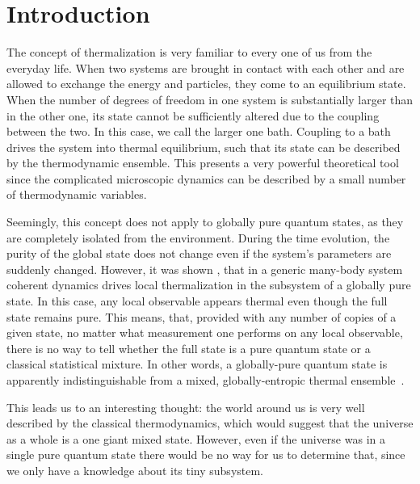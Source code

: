 \chapter{Introduction}
\label{introduction}

The concept of thermalization is very familiar to every one of us from the everyday life. When two systems are brought in contact with each other and are allowed to exchange the energy and particles, they come to an equilibrium state. When the number of degrees of freedom in one system is substantially larger than in the other one, its state cannot be sufficiently altered due to the coupling between the two. In this case, we call the larger one bath. Coupling to a bath drives the system into thermal equilibrium, such that its state can be described by the thermodynamic ensemble. This presents a very powerful theoretical tool since the complicated microscopic dynamics can be described by a small number of thermodynamic variables.

Seemingly, this concept does not apply to globally pure quantum states, as they are completely isolated from the environment. During the time evolution, the purity of the global state does not change even if the system's parameters are suddenly changed. However, it was shown \cite{Deutsch1991, Rigol2008, Eisert2015}, that in a generic many-body system coherent dynamics drives local thermalization in the subsystem of a globally pure state. In this case, any local observable appears thermal even though the full state remains pure. This means, that, provided with any number of copies of a given state,  no matter what measurement one performs on any local observable, there is no way to tell whether the full state is a pure quantum state or a classical statistical mixture. In other words, a globally-pure quantum state is apparently indistinguishable from a mixed, globally-entropic thermal ensemble~\cite{Shankar1985, Deutsch1991, Srednicki1994, Rigol2008}.

This leads us to an interesting thought: the world around us is very well described by the classical thermodynamics, which would suggest that the universe as a whole is a one giant mixed state. However, even if the universe was in a single pure quantum state there would be no way for us to determine that, since we only have a knowledge about its tiny subsystem.

